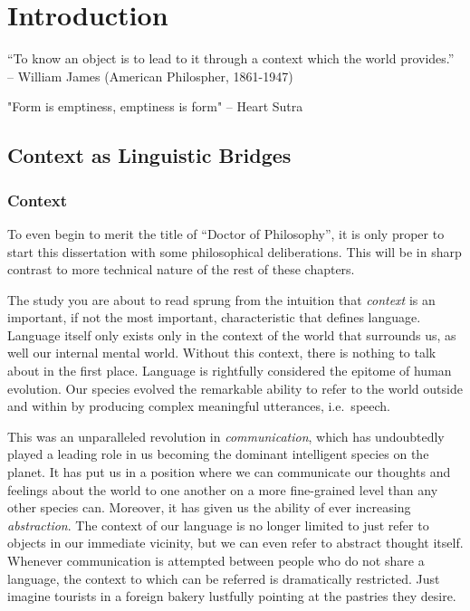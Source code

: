 \chapter{Introduction}
\label{chap:intro}

“To know an object is to lead to it through a context which the world provides.” -- William James (American Philospher, 1861-1947)

"Form is emptiness, emptiness is form" -- Heart Sutra

\section{Context as Linguistic Bridges}

\subsection{Context}

To even begin to merit the title of ``Doctor of Philosophy'', it is only proper
to start this dissertation with some philosophical deliberations. This will be
in sharp contrast to more technical nature of the rest of these chapters.

The study you are about to read sprung from the intuition that \emph{context}
is an important, if not the most important, characteristic that defines
language. Language itself only exists only in the context of the world that
surrounds us, as well our internal mental world. Without this context, there is
nothing to talk about in the first place. Language is rightfully considered the
epitome of human evolution. Our species evolved the remarkable ability to refer
to the world outside and within by producing complex meaningful utterances,
i.e.\ speech. 


This was an unparalleled revolution in \emph{communication}, which has
undoubtedly played a leading role in us becoming the dominant intelligent
species on the planet. It has put us in a position where we can communicate our
thoughts and feelings about the world to one another on a more fine-grained
level than any other species can. Moreover, it has given us the ability of ever
increasing \emph{abstraction}. The context of our language is no longer limited
to just refer to objects in our immediate vicinity, but we can even refer to
abstract thought itself. Whenever communication is attempted between people who
do not share a language, the context to which can be referred is dramatically
restricted.  Just imagine tourists in a foreign bakery lustfully pointing at
the pastries they desire. 

